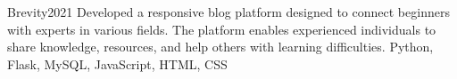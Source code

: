 \begin{projects}
	\project
	{Brevity}{2021}
	{}
	{Developed a responsive blog platform designed to connect beginners with experts in various fields. The platform enables experienced individuals to share knowledge, resources, and help others with learning difficulties.}
	{Python, Flask, MySQL, JavaScript, HTML, CSS}

\end{projects}